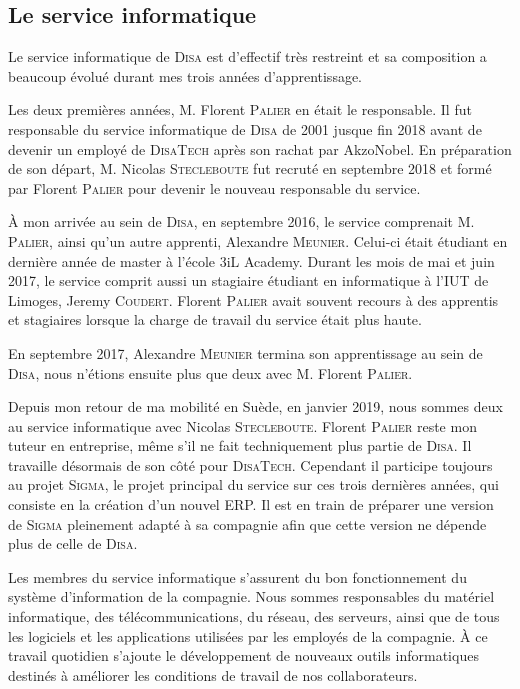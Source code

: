 \subsection{Le service informatique}

Le service informatique de \textsc{Disa} est d'effectif très restreint et sa composition a beaucoup évolué durant mes trois années d'apprentissage.

Les deux premières années, M. Florent \textsc{Palier} en était le responsable. 
Il fut responsable du service informatique de \textsc{Disa} de 2001 jusque fin 2018 avant de devenir un employé de \textsc{DisaTech} après son rachat par AkzoNobel.
En préparation de son départ, M. Nicolas \textsc{Stecleboute} fut recruté en septembre 2018 et formé par Florent \textsc{Palier} pour devenir le nouveau responsable du service.

À mon arrivée au sein de \textsc{Disa}, en septembre 2016, le service comprenait M. \textsc{Palier}, ainsi qu'un autre apprenti, Alexandre \textsc{Meunier}.
Celui-ci était étudiant en dernière année de master à l'école 3iL Academy.
Durant les mois de mai et juin 2017, le service comprit aussi un stagiaire étudiant en informatique à l'IUT de Limoges, Jeremy \textsc{Coudert}.
Florent \textsc{Palier} avait souvent recours à des apprentis et stagiaires lorsque la charge de travail du service était plus haute.

En septembre 2017, Alexandre \textsc{Meunier} termina son apprentissage au sein de \textsc{Disa}, nous n'étions ensuite plus que deux avec M. Florent \textsc{Palier}.

Depuis mon retour de ma mobilité en Suède, en janvier 2019, nous sommes deux au service informatique avec Nicolas \textsc{Stecleboute}.
Florent \textsc{Palier} reste mon tuteur en entreprise, même s'il ne fait techniquement plus partie de \textsc{Disa}.
Il travaille désormais de son côté pour \textsc{DisaTech}.
Cependant il participe toujours au projet \textsc{Sigma}, le projet principal du service sur ces trois dernières années, qui consiste en la création d'un nouvel ERP\footnotemark.
Il est en train de préparer une version de \textsc{Sigma} pleinement adapté à sa compagnie afin que cette version ne dépende plus de celle de \textsc{Disa}.

Les membres du service informatique s'assurent du bon fonctionnement du système d'information de la compagnie.
Nous sommes responsables du matériel informatique, des télécommunications, du réseau, des serveurs, ainsi que de tous les logiciels et les applications utilisées par les employés de la compagnie.
À ce travail quotidien s'ajoute le développement de nouveaux outils informatiques destinés à améliorer les conditions de travail de nos collaborateurs.

